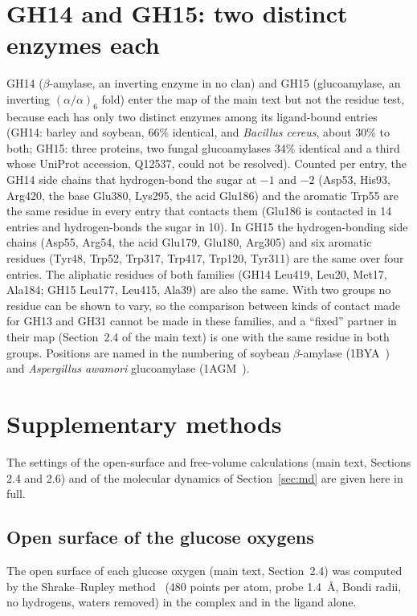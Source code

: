 \documentclass[preprint,12pt]{elsarticle}
\begin{document}
\section{GH14 and GH15: two distinct enzymes each}\label{sec:gh1415}
GH14 ($\beta$-amylase, an inverting enzyme in no clan) and GH15 (glucoamylase, an inverting $(\alpha/\alpha)_6$ fold)
enter the map of the main text but not the residue test, because each has only two distinct enzymes among its
ligand-bound entries (GH14: barley and soybean, 66\% identical, and \emph{Bacillus cereus}, about 30\% to both; GH15:
three proteins, two fungal glucoamylases 34\% identical and a third whose UniProt accession, Q12537, could not be
resolved). Counted per entry, the GH14 side chains that hydrogen-bond the sugar at $-1$ and $-2$ (Asp53, His93,
Arg420, the base Glu380, Lys295, the acid Glu186) and the aromatic Trp55 are the same residue in every entry that
contacts them (Glu186 is contacted in 14 entries and hydrogen-bonds the sugar in 10). In GH15 the hydrogen-bonding
side chains (Asp55, Arg54, the acid Glu179, Glu180, Arg305) and six aromatic residues (Tyr48, Trp52, Trp317, Trp417,
Trp120, Tyr311) are the same over four entries. The aliphatic residues of both families (GH14 Leu419, Leu20, Met17,
Ala184; GH15 Leu177, Leu415, Ala39) are also the same. With two groups no residue can be shown to vary, so the
comparison between kinds of contact made for GH13 and GH31 cannot be made in these families, and a ``fixed''
partner in their map (Section~2.4 of the main text) is one with the same residue in both groups. Positions are named in the
numbering of soybean $\beta$-amylase (1BYA~\citep{Mikami1994}) and \emph{Aspergillus awamori} glucoamylase
(1AGM~\citep{Aleshin1994}).

\section{Supplementary methods}\label{sec:simethods}
The settings of the open-surface and free-volume calculations (main text, Sections 2.4 and 2.6) and of the
molecular dynamics of Section~\ref{sec:md} are given here in full.

\subsection{Open surface of the glucose oxygens}\label{sec:sisasa}
The open surface of each glucose oxygen (main text, Section~2.4) was computed by the Shrake--Rupley
method~\citep{Shrake1973} (480 points per atom, probe 1.4~\AA, Bondi radii, no hydrogens, waters removed) in
the complex and in the ligand alone.
\end{document}
